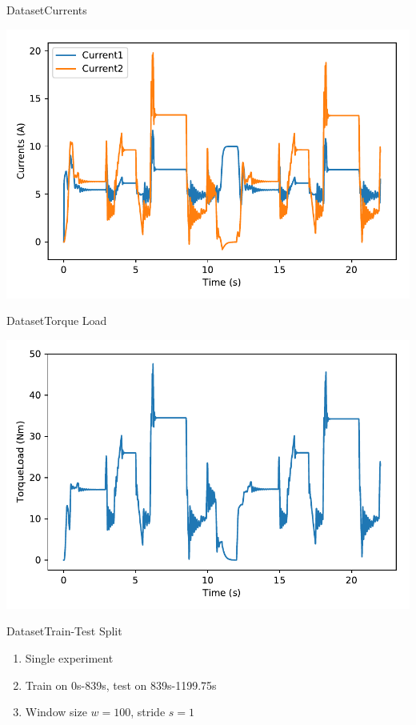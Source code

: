 \documentclass[handout]{beamer}
\begin{document}
\begin{frame}{Dataset}{Currents}
\begin{center}
  \includegraphics[scale=0.6]{images/currents_vs_time}
\end{center}
\end{frame}

\begin{frame}{Dataset}{Torque Load}
\begin{center}
  \includegraphics[scale=0.6]{images/torqueload_vs_time}
\end{center}
\end{frame}

\begin{frame}{Dataset}{Train-Test Split}
  \begin{enumerate}
    \item Single experiment
    \item Train on 0s-839s, test on 839s-1199.75s
    \item Window size $w=100$, stride $s=1$
  \end{enumerate}
\end{frame}
\end{document}
